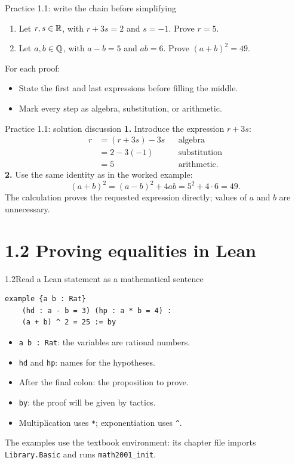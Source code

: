 \begin{frame}{Practice 1.1: write the chain before simplifying}
\begin{enumerate}
\item Let $r,s\in\mathbb{R}$, with $r+3s=2$ and $s=-1$. Prove $r=5$.
\item Let $a,b\in\mathbb{Q}$, with $a-b=5$ and $ab=6$. Prove $(a+b)^2=49$.
\end{enumerate}
\vspace{1em}
For each proof:
\begin{itemize}
\item State the first and last expressions before filling the middle.
\item Mark every step as algebra, substitution, or arithmetic.
\end{itemize}
\end{frame}

\begin{frame}{Practice 1.1: solution discussion}
\textbf{1.} Introduce the expression $r+3s$:
\[
\begin{aligned}
r&=(r+3s)-3s&&\text{algebra}\\
 &=2-3(-1)&&\text{substitution}\\
 &=5&&\text{arithmetic}.
\end{aligned}
\]
\textbf{2.} Use the same identity as in the worked example:
\[
(a+b)^2=(a-b)^2+4ab=5^2+4\cdot6=49.
\]
The calculation proves the requested expression directly; values of $a$ and $b$ are unnecessary.
\end{frame}

\section{1.2 Proving equalities in Lean}
\begin{frame}[fragile]{1.2\quad Read a Lean statement as a mathematical sentence}
\begin{lstlisting}
example {a b : Rat}
    (hd : a - b = 3) (hp : a * b = 4) :
    (a + b) ^ 2 = 25 := by
\end{lstlisting}
\begin{itemize}
\item \texttt{a b : Rat}: the variables are rational numbers.
\item \texttt{hd} and \texttt{hp}: names for the hypotheses.
\item After the final colon: the proposition to prove.
\item \texttt{by}: the proof will be given by tactics.
\item Multiplication uses \texttt{*}; exponentiation uses \texttt{\^{}}.
\end{itemize}
The examples use the textbook environment: its chapter file imports
\texttt{Library.Basic} and runs \texttt{math2001\_init}.
\end{frame}

